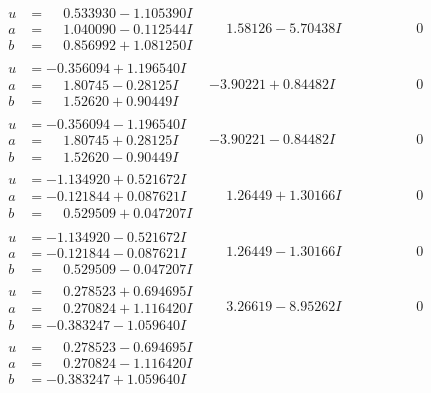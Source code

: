 \documentclass[1p]{elsarticle_modified}
\theoremstyle{definition}
\begin{document}
$$\begin{array}{c|c|c}
\begin{aligned}
u &= \phantom{-}0.533930 - 1.105390 I \\
a &= \phantom{-}1.040090 - 0.112544 I \\
b &= \phantom{-}0.856992 + 1.081250 I\end{aligned}
 & \phantom{-}1.58126 - 5.70438 I & \phantom{-0.000000 } 0 \\ \hline\begin{aligned}
u &= -0.356094 + 1.196540 I \\
a &= \phantom{-}1.80745 - 0.28125 I \\
b &= \phantom{-}1.52620 + 0.90449 I\end{aligned}
 & -3.90221 + 0.84482 I & \phantom{-0.000000 } 0 \\ \hline\begin{aligned}
u &= -0.356094 - 1.196540 I \\
a &= \phantom{-}1.80745 + 0.28125 I \\
b &= \phantom{-}1.52620 - 0.90449 I\end{aligned}
 & -3.90221 - 0.84482 I & \phantom{-0.000000 } 0 \\ \hline\begin{aligned}
u &= -1.134920 + 0.521672 I \\
a &= -0.121844 + 0.087621 I \\
b &= \phantom{-}0.529509 + 0.047207 I\end{aligned}
 & \phantom{-}1.26449 + 1.30166 I & \phantom{-0.000000 } 0 \\ \hline\begin{aligned}
u &= -1.134920 - 0.521672 I \\
a &= -0.121844 - 0.087621 I \\
b &= \phantom{-}0.529509 - 0.047207 I\end{aligned}
 & \phantom{-}1.26449 - 1.30166 I & \phantom{-0.000000 } 0 \\ \hline\begin{aligned}
u &= \phantom{-}0.278523 + 0.694695 I \\
a &= \phantom{-}0.270824 + 1.116420 I \\
b &= -0.383247 - 1.059640 I\end{aligned}
 & \phantom{-}3.26619 - 8.95262 I & \phantom{-0.000000 } 0 \\ \hline\begin{aligned}
u &= \phantom{-}0.278523 - 0.694695 I \\
a &= \phantom{-}0.270824 - 1.116420 I \\
b &= -0.383247 + 1.059640 I\end{aligned}

\end{array}$$
\end{document}
